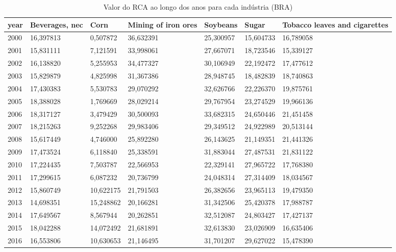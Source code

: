 \begin{table}
\centering
\caption{Valor do RCA ao longo dos anos para cada indústria (BRA)}
\begin{tabular}{p{1cm}p{2cm}p{2cm}p{2cm}p{2cm}p{2cm}p{2cm}}
\toprule
 year &  Beverages, nec &      Corn &  Mining of iron ores &  Soybeans &     Sugar &  Tobacco leaves and cigarettes \\
\midrule
 2000 &       16,397813 &  0,507872 &            36,632391 & 25,300957 & 15,604733 &                      16,789058 \\
 2001 &       15,831111 &  7,121591 &            33,998061 & 27,667071 & 18,723546 &                      15,339127 \\
 2002 &       16,138820 &  5,255953 &            34,477327 & 30,106949 & 22,192472 &                      17,477612 \\
 2003 &       15,829879 &  4,825998 &            31,367386 & 28,948745 & 18,482839 &                      18,740863 \\
 2004 &       17,430383 &  5,530783 &            29,070292 & 32,626766 & 22,226370 &                      19,875761 \\
 2005 &       18,388028 &  1,769669 &            28,029214 & 29,767954 & 23,274529 &                      19,966136 \\
 2006 &       18,317127 &  3,479429 &            30,500093 & 33,682315 & 24,650446 &                      21,451458 \\
 2007 &       18,215263 &  9,252268 &            29,983406 & 29,349512 & 24,922989 &                      20,513144 \\
 2008 &       15,617449 &  4,746000 &            25,892280 & 26,143625 & 21,149351 &                      21,441326 \\
 2009 &       17,473524 &  6,118840 &            25,338591 & 31,883044 & 27,487531 &                      21,831122 \\
 2010 &       17,224435 &  7,503787 &            22,566953 & 22,329141 & 27,965722 &                      17,768380 \\
 2011 &       17,299615 &  6,087232 &            20,736799 & 24,048314 & 27,314409 &                      18,034567 \\
 2012 &       15,860749 & 10,622175 &            21,791503 & 26,382656 & 23,965113 &                      19,479350 \\
 2013 &       14,698351 & 15,248862 &            20,166281 & 31,342506 & 25,420378 &                      17,988787 \\
 2014 &       17,649567 &  8,567944 &            20,262851 & 32,512087 & 24,803427 &                      17,427137 \\
 2015 &       18,042288 & 14,072492 &            21,681891 & 32,613830 & 23,026909 &                      16,635406 \\
 2016 &       16,553806 & 10,630653 &            21,146495 & 31,701207 & 29,627022 &                      15,478390 \\
\bottomrule
\end{tabular}
\end{table}
